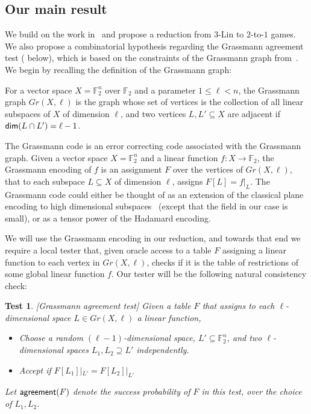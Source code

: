 \documentclass{toc}
\newtheorem{test}[theorem]{Test}
\renewcommand\leq{\leqslant}
\renewcommand\subset{\subseteq}
\renewcommand\supset{\supseteq}
\def\F{\mathbb{F}}
\def\agr{{\sf agreement}}
\begin{document}
\subsection{Our main result}

We build on the work in~\cite{KMS} and propose a reduction from $3$-Lin
to $2$-to-$1$ games. We also propose a combinatorial hypothesis
regarding the Grassmann
agreement test ( below), which is based on the
constraints of the Grassmann graph from~\cite{KMS}. We begin by recalling
the definition of the Grassmann graph:
\begin{definition}
For a vector space $X = \mathbb{F}_2^n$
over %
$\mathbb{F}_2$  %
and a parameter $1\leq \ell<n$, the Grassmann
graph $Gr(X,\ell)$ is the graph whose set of vertices is the collection of all linear subspaces
of $X$ of dimension $\ell$, and two vertices $L,L'\subseteq X$ are
%
adjacent  %
if
  ${\sf dim}(L\cap L') = \ell-1$.
\end{definition}

The Grassmann code is an error correcting code associated with the Grassmann graph.
Given a vector space $X = \mathbb{F}_2^n$ and a linear function $f\colon X\to\mathbb{F}_2$,
the Grassmann encoding of $f$ is an assignment $F$ over the vertices of $Gr(X,\ell)$, that
to each subspace $L\subseteq X$ of dimension $\ell$, assigns $F[L] = f|_{L}$.
The Grassmann code could either be thought of as an extension of the classical plane
encoding to high dimensional subspaces~\cite{RaSa}
(except that the field in our case is small), or as a tensor
power
%
of the Hadamard encoding.

We will use the Grassmann encoding in our reduction, and towards that end we require a
local tester that, given oracle access to
a table $F$ assigning a linear function to each vertex in $Gr(X,\ell)$, checks if it is
the table of restrictions of some global
linear function $f$. Our tester will be the following natural consistency check:
%
\begin{test}\label{Grtest}[Grassmann agreement test\label{test:CxC}]  %
Given a table $F$ that assigns to each $\ell$-dimensional space $L\in Gr(X,\ell)$ a
linear function,
\begin{itemize}
  \item Choose a random $(\ell-1)$-dimensional space, $L'\subset \F_2^n$, and two $\ell$-dimensional spaces $L_1,L_2\supset L'$ independently.
  \item Accept if $F[L_1]|_{L'} = F[L_2]|_{L'}$
\end{itemize}
Let $\agr(F)$ denote the success probability of $F$ in this test, over the choice of $L_1,L_2$.
\end{test}
\end{document}
